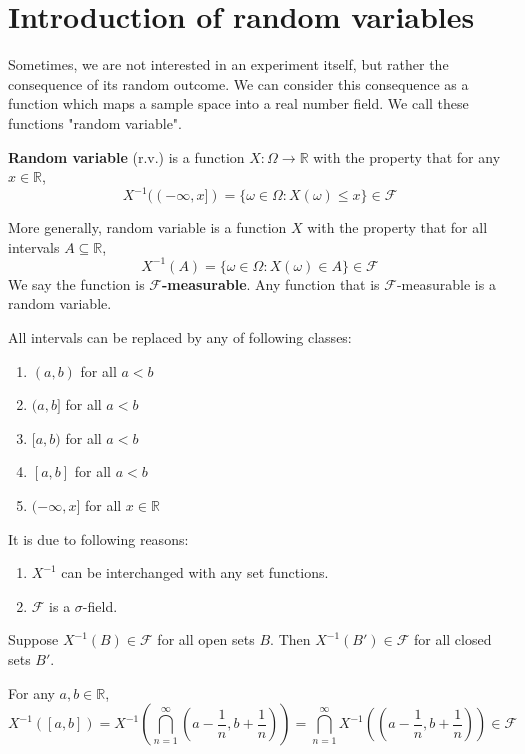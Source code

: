 \documentclass{huhtakm-template-book}
\begin{document}
\section{Introduction of random variables}
Sometimes, we are not interested in an experiment itself, but rather the consequence of its random outcome. We can consider this consequence as a function which maps a sample space into a real number field. We call these functions "random variable".
\begin{defn}
	\textbf{Random variable} (r.v.) is a function $X:\Omega\to\mathbb{R}$ with the property that for any $x\in\mathbb{R}$,
	\begin{equation*}
		X^{-1}((-\infty,x])=\{\omega\in\Omega:X(\omega)\leq x\}\in\mathcal{F}
	\end{equation*}
\end{defn}
\begin{rem}
	More generally, random variable is a function $X$ with the property that for all intervals $A\subseteq\mathbb{R}$, 
	\begin{equation*}
		X^{-1}(A)=\{\omega\in\Omega: X(\omega)\in A\}\in\mathcal{F}
	\end{equation*}
	We say the function is \textbf{$\mathcal{F}$-measurable}. Any function that is $\mathcal{F}$-measurable is a random variable.
\end{rem}
\begin{rem}
	All intervals can be replaced by any of following classes:
	\begin{enumerate}
		\item $(a,b)$ for all $a<b$
		\item $(a,b]$ for all $a<b$
		\item $[a,b)$ for all $a<b$
		\item $[a,b]$ for all $a<b$
		\item $(-\infty,x]$ for all $x\in\mathbb{R}$
	\end{enumerate}
	It is due to following reasons:
	\begin{enumerate}
		\item $X^{-1}$ can be interchanged with any set functions.
		\item $\mathcal{F}$ is a $\sigma$-field.
	\end{enumerate}
\end{rem}
\begin{cla}
	Suppose $X^{-1}(B)\in\mathcal{F}$ for all open sets $B$. Then $X^{-1}(B')\in\mathcal{F}$ for all closed sets $B'$.
\end{cla}
\begin{proofing}
	For any $a,b\in\mathbb{R}$,
	\begin{equation*}
		X^{-1}([a,b])=X^{-1}\left(\bigcap_{n=1}^{\infty}\left(a-\frac{1}{n},b+\frac{1}{n}\right)\right)=\bigcap_{n=1}^{\infty}X^{-1}\left(\left(a-\frac{1}{n},b+\frac{1}{n}\right)\right)\in\mathcal{F}
	\end{equation*}
\end{proofing}
\end{document}
